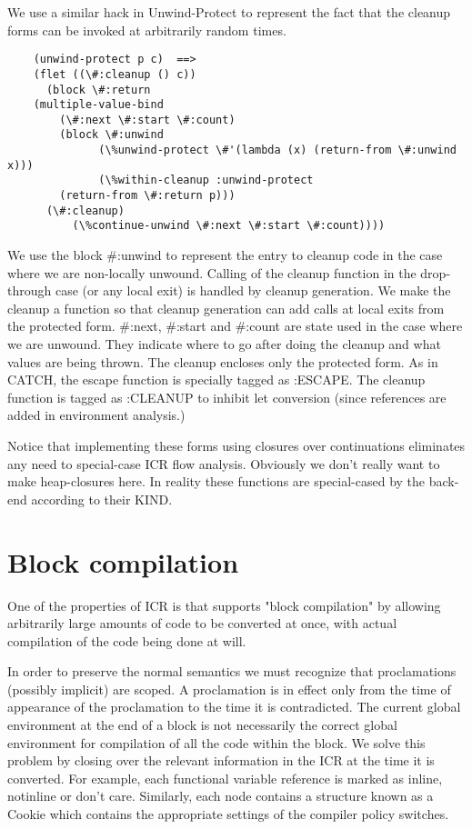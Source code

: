 We use a similar hack in Unwind-Protect to represent the fact that the cleanup
forms can be invoked at arbitrarily random times.
\begin{verbatim}
    (unwind-protect p c)  ==>
    (flet ((\#:cleanup () c))
      (block \#:return
	(multiple-value-bind
	    (\#:next \#:start \#:count)
	    (block \#:unwind
              (\%unwind-protect \#'(lambda (x) (return-from \#:unwind x)))
              (\%within-cleanup :unwind-protect
		(return-from \#:return p)))
	  (\#:cleanup)
          (\%continue-unwind \#:next \#:start \#:count))))
\end{verbatim}
We use the block \#:unwind to represent the entry to cleanup code in the case
where we are non-locally unwound.  Calling of the cleanup function in the
drop-through case (or any local exit) is handled by cleanup generation.  We
make the cleanup a function so that cleanup generation can add calls at local
exits from the protected form.  \#:next, \#:start and \#:count are state used in
the case where we are unwound.  They indicate where to go after doing the
cleanup and what values are being thrown.  The cleanup encloses only the
protected form.  As in CATCH, the escape function is specially tagged as
:ESCAPE.  The cleanup function is tagged as :CLEANUP to inhibit let conversion
(since references are added in environment analysis.)

Notice that implementing these forms using closures over continuations
eliminates any need to special-case ICR flow analysis.  Obviously we don't
really want to make heap-closures here.  In reality these functions are
special-cased by the back-end according to their KIND.


\section{Block compilation}

One of the properties of ICR is that supports "block compilation" by allowing
arbitrarily large amounts of code to be converted at once, with actual
compilation of the code being done at will.


In order to preserve the normal semantics we must recognize that proclamations
(possibly implicit) are scoped.  A proclamation is in effect only from the time
of appearance of the proclamation to the time it is contradicted.  The current
global environment at the end of a block is not necessarily the correct global
environment for compilation of all the code within the block.  We solve this
problem by closing over the relevant information in the ICR at the time it is
converted.  For example, each functional variable reference is marked as
inline, notinline or don't care.  Similarly, each node contains a structure
known as a Cookie which contains the appropriate settings of the compiler
policy switches.

